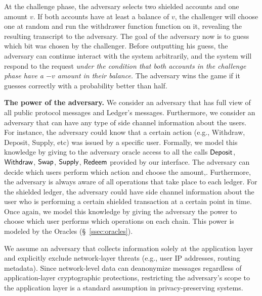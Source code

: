 At the challenge phase, the adversary selects two shielded accounts and one amount $v$.
If both accounts have at least a balance of $v$,  the challenger will choose one at random and run the withdrawer function function on it, revealing the resulting transcript to the adversary.
The goal of the adversary now is to guess which bit was chosen by the challenger.
Before outputting his guess, the adversary can continue interact with the  system arbitrarily, and the system will respond to the request  \emph{under the condition that both accounts in the challenge phase  have a $-v$ amount in their balance.}
The adversary wins the game if it guesses correctly with a probability better than half.

\vspace{5pt}
\noindent
\textbf{The power of the adversary.}
We consider an adversary that has full view of all public protocol messages and
Ledger's messages.
Furthermore, we consider an adversary that can have any type of side channel information about the users. For instance, the adversary could know that
a certain action (e.g., Withdraw, Deposit, Supply, etc) was issued by a specific user.
Formally, we model this knowledge by giving to the adversary oracle access
to all the calls $\mathsf{Deposit}$, $\mathsf{Withdraw}$, $\mathsf{Swap}$, $\mathsf{Supply}$, $\mathsf{Redeem}$ provided by our interface. The adversary can decide which users perform which action and choose the amount,.
Furthermore, the adversary is always aware of all operations that take place to each ledger. For the shielded ledger, the adversary could have side channel information about the user who is performing a certain shielded transaction at a certain point in time.
Once again, we model this knowledge by giving the adversary the power to choose which user performs which operations on each chain. This power is modeled by the Oracles (\S~\ref{ssec:oracles}).

\begin{remark}
We assume an adversary that collects information solely at the application layer and explicitly exclude network-layer threats (e.g., user IP addresses, routing metadata). Since network-level data can deanonymize messages regardless of application-layer cryptographic protections, restricting the adversary's scope to the application layer is a standard assumption in privacy-preserving systems.
\end{remark}

